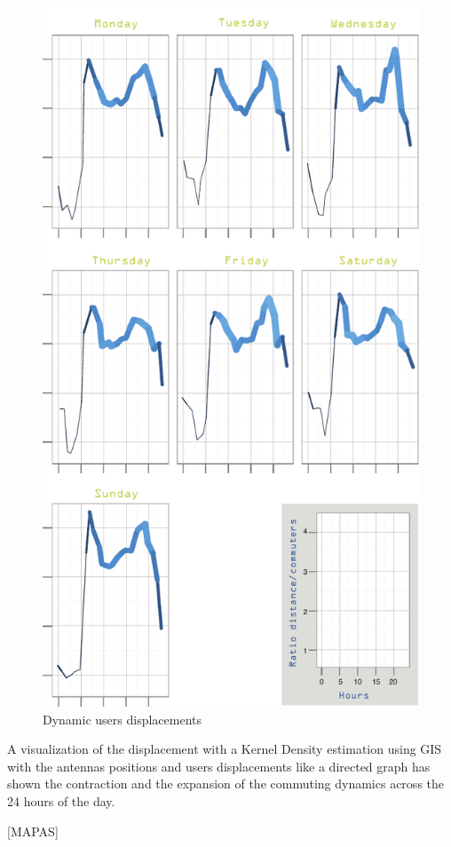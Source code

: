 \begin{figure}[h]
\begin{center}
\includegraphics[scale = 1.0] {results/images/commuting_results.pdf}
\caption{Dynamic users displacements}
\label{fig:dynamic_displacements}
\end{center}
\end{figure}

A visualization of the displacement with a Kernel Density estimation using GIS with the antennas positions and users displacements like a directed graph has shown the contraction and the expansion of the commuting dynamics across the 24 hours of the day.

[MAPAS]